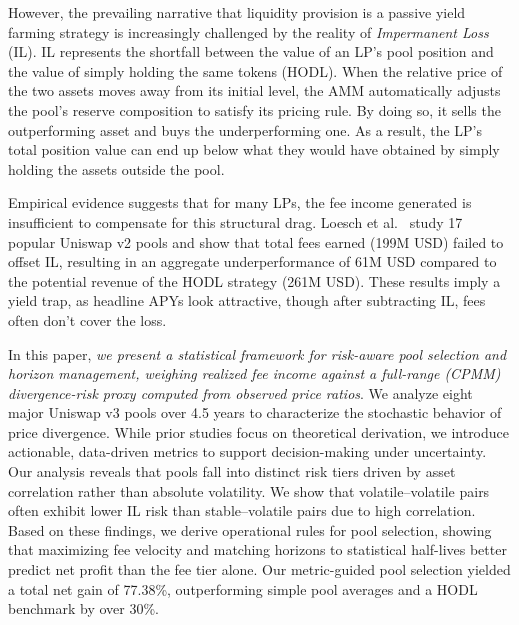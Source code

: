 \documentclass[journal]{IEEEtran}
\begin{document}
However, the prevailing narrative that liquidity provision is a passive yield farming strategy is increasingly challenged by the reality of \textit{Impermanent Loss} (IL). IL represents the shortfall between the value of an LP’s pool position and the value of simply holding the same tokens (HODL). When the relative price of the two assets moves away from its initial level, the AMM automatically adjusts the pool’s reserve composition to satisfy its pricing rule. 
By doing so, it sells the outperforming asset and buys the underperforming one. 
As a result, the LP's total position value can end up below what they would have obtained by simply holding the assets outside the pool.


Empirical evidence suggests that for many LPs, the fee income generated is insufficient to compensate for this structural drag. 
Loesch et al.~\cite{loesch2021impermanent} study 17 popular Uniswap v2 pools and show that total fees earned (199M USD) failed to offset IL, resulting in an aggregate underperformance of 61M USD compared to the potential revenue of the HODL strategy (261M USD). 
These results imply a yield trap, as headline APYs look attractive, though after subtracting IL, fees often don’t cover the loss.

In this paper, \textit{we present a statistical framework for risk-aware pool selection and horizon management, weighing realized fee income against a full-range (CPMM) divergence-risk proxy computed from observed price ratios}. We analyze eight major Uniswap v3 pools over 4.5 years to characterize the stochastic behavior of price divergence. While prior studies focus on theoretical derivation, we introduce actionable, data-driven metrics to support decision-making under uncertainty.
Our analysis reveals that pools fall into distinct risk tiers driven by asset correlation rather than absolute volatility. We show that volatile--volatile pairs often exhibit lower IL risk than stable--volatile pairs due to high correlation. Based on these findings, we derive operational rules for pool selection, showing that maximizing fee velocity and matching horizons to statistical half-lives better predict net profit than the fee tier alone.
Our metric-guided pool selection yielded a total net gain of 77.38\%, outperforming simple pool averages and a HODL benchmark by over 30\%.


\end{document}
